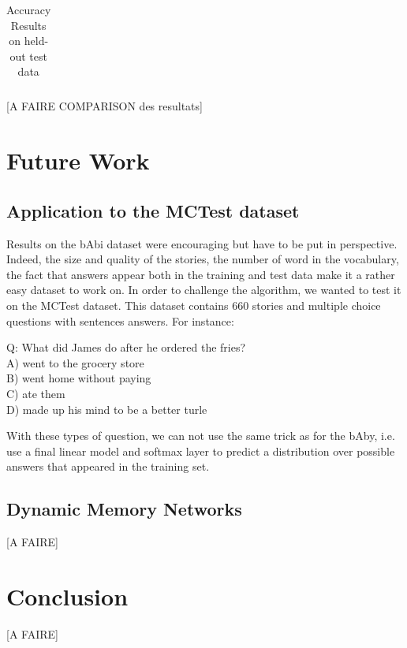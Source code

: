 \documentclass[twoside,11pt]{article}
\begin{document}
\begin{table}[H]
{\begin{tabular}{cccccccc}
\end{tabular}

}
\caption{Accuracy Results on held-out test data}
\end{table}

[A FAIRE COMPARISON des resultats]
\section{Future Work}
\subsection{Application to the MCTest dataset}
Results on the bAbi dataset were encouraging but have to be put in perspective. Indeed, the size and quality of the stories, the number of word in the vocabulary, the fact that answers appear both in the training and test data make it a rather easy dataset to work on. In order to challenge the algorithm, we wanted to test it on the MCTest dataset. This dataset contains 660 stories and multiple choice questions with sentences answers. For instance:
\begin{framed}
\begin{center}
Q:  What did James do after he ordered the fries?\\
A) went to the grocery store\\
B) went home without paying\\
C) ate them\\
D) made up his mind to be a better turle\\
\end{center}
\end{framed}
\noindent With these types of question, we can not use the same trick as for the bAby, i.e. use a final linear model and softmax layer to predict a distribution over possible answers that appeared in the training set. 
\subsection{Dynamic Memory Networks}
[A FAIRE]
\section{Conclusion}
[A FAIRE]
\vskip 0.2in

\end{document}
